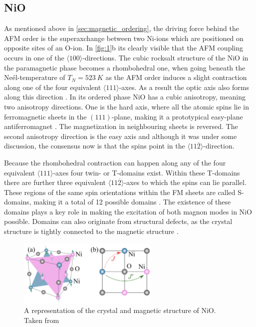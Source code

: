 \subsection{NiO}
As mentioned above in \autoref{sec:magnetic_ordering}, the driving force behind the AFM order is the superaxchange between two Ni-ions which are positioned on opposite sites of an O-ion.
In \autoref{fig:1}b its clearly visible that the AFM coupling occurs in one of the $\langle100\rangle$-directions.
The cubic rocksalt structure of the NiO in the paramagnetic phase becomes a rhombohedral one, when going beneath the Neél-temperature of $T_N = \qty{523}{K}$ as the AFM order induces a slight contraction along one of the four equivalent $\langle111\rangle$-axes.
As a result the optic axis also forms along this direction .
In its ordered phase NiO has a cubic anisotropy, meaning two anisotropy directions.
One is the hard axis, where all the atomic spins lie in ferromagnetic sheets in the $(111)$-plane, making it a prototypical easy-plane antiferromagnet .
The magnetization in neighbouring sheets is reversed.
The second anisotropy direction is the easy axis and although it was under some discussion, the consensus now is  that the spins point in the $\langle11\overline{2}\rangle$-direction.

Because the rhombohedral contraction can happen along any of the four equivalent $\langle111\rangle$-axes four twin- or T-domains exist.
Within these T-domains there are further three equivalent $\langle11\overline{2}\rangle$-axes to which the spins can lie parallel.
These regions of the same spin orientations within the FM sheets are called S-domains, making it a total of 12 possible domains .
The existence of these domains plays a key role in making the excitation of both magnon modes in NiO possible.
Domains can also originate from structural defects, as the crystal structure is tightly connected to the magnetic structure .
\begin{figure}[ht]
    \centering
    \includegraphics[width=0.6\textwidth]{pictures/1.png}
    \caption{A representation of the crystal and magnetic structure of NiO. Taken from }
    \label{fig:1}
\end{figure}
\FloatBarrier

